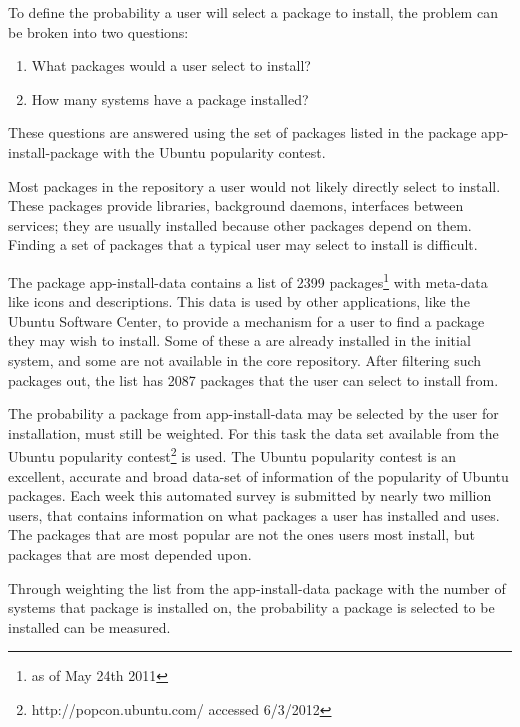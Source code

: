 To define the probability a user will select a package to install, the problem can be broken into two questions:
\begin{enumerate}
  \item What packages would a user select to install?
  \item How many systems have a package installed?
\end{enumerate}
These questions are answered using the set of packages listed in the package app-install-package with the Ubuntu popularity contest.

Most packages in the repository a user would not likely directly select to install.
These packages provide libraries, background daemons, interfaces between services; they are usually installed because other packages depend on them.
Finding a set of packages that a typical user may select to install is difficult.

The package app-install-data contains a list of 2399 packages\footnote{as of May 24th 2011} with meta-data like icons and descriptions.
This data is used by other applications, like the Ubuntu Software Center, to provide a mechanism for a user to find a package they may wish to install.
Some of these a are already installed in the initial system, and some are not available in the core repository.
After filtering such packages out, the list has 2087 packages that the user can select to install from. 

The probability a package from app-install-data may be selected by the user for installation, must still be weighted.
For this task the data set available from the Ubuntu popularity contest\footnote{http://popcon.ubuntu.com/ accessed 6/3/2012} is used.
The Ubuntu popularity contest is an excellent, accurate and broad data-set of information of the popularity of Ubuntu packages.
Each week this automated survey is submitted by nearly two million users, that contains information on what packages a user has installed and uses.
The packages that are most popular are not the ones users most install, but packages that are most depended upon.

Through weighting the list from the app-install-data package with the number of systems that package is installed on,
the probability a package is selected to be installed can be measured.

